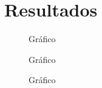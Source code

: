\chapter{Resultados}



\begin{figure}[H]
    \centering
    
    \caption{Gráfico}
\end{figure}

\begin{figure}[H]
    \centering
    
    \caption{Gráfico}
\end{figure}

\begin{figure}[H]
    \centering
    
    \caption{Gráfico}
\end{figure}
